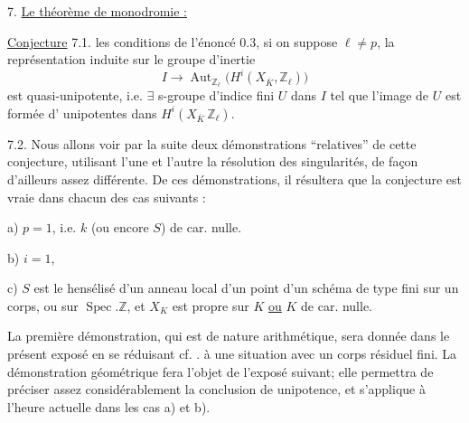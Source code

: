 
7. \uline{Le théorème de monodromie :}  


\uline{Conjecture} 7.1.  
les conditions de l'énoncé 0.3, si on suppose $\ell\ne p$, la représentation induite sur le groupe d'inertie
\[
 I\longrightarrow \operatorname{Aut}_{\mathbb Z_\ell}\bigl(H^i(X_{\overline K},\mathbb Z_\ell)\bigr)
\]
est quasi-unipotente, i.e. $\exists$ s-groupe d'indice fini $U$ dans $I$ tel que l'image de $U$ est formée d' unipotentes dans $H^i(X_{\overline K}\,\mathbb Z_\ell)$.

7.2. Nous allons voir par la suite deux démonstrations ``relatives'' de cette conjecture, utilisant l'une et l'autre la résolution des singularités,  de façon d'ailleurs assez différente. De ces démonstrations, il résultera que la conjecture est vraie dans chacun des cas suivants :

a) $p=1$, i.e. $k$ (ou encore $S$) de car. nulle.

b) $i=1$,

c) $S$ est le hensélisé  d'un anneau local d'un point d'un schéma de type fini sur un corps, ou sur $\operatorname{Spec}.\mathbb Z$, et $X_K$ est propre sur $K$ \uline{ou} $K$ de car. nulle.

La première démonstration, qui est de nature arithmétique, sera donnée dans le
présent exposé en se réduisant cf. . à  une situation avec un corps résiduel fini. 
 La démonstration géométrique fera l'objet de l'exposé suivant; elle permettra de préciser assez considérablement  la conclusion de unipotence, et  s'applique à l'heure actuelle dans les cas a) et b).

